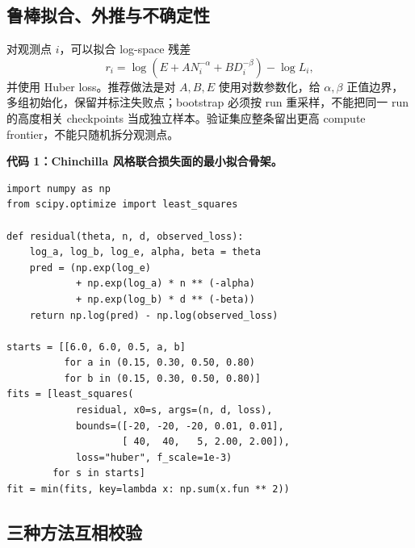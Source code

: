 \documentclass[UTF8,10pt,a4paper,fontset=none]{ctexart}
\begin{document}
\subsection{鲁棒拟合、外推与不确定性}

对观测点 $i$，可以拟合 log-space 残差
\begin{equation}
 r_i=\log\!\left(E+A N_i^{-\alpha}+B D_i^{-\beta}\right)-\log L_i,
 \label{zh:eq:residual}
\end{equation}
并使用 Huber loss。推荐做法是对 $A,B,E$ 使用对数参数化，给 $\alpha,\beta$ 正值边界，多组初始化，保留并标注失败点；bootstrap 必须按 run 重采样，不能把同一 run 的高度相关 checkpoints 当成独立样本。验证集应整条留出更高 compute frontier，不能只随机拆分观测点。

\noindent\textbf{代码 1：Chinchilla 风格联合损失面的最小拟合骨架。}\par\vspace{5pt}
\begin{small}
\setlength{\fboxsep}{7pt}
\setlength{\fboxrule}{0.4pt}
\begin{lrbox}{\fitcodebox}
\begin{minipage}{\dimexpr\textwidth-2\fboxsep-2\fboxrule\relax}
\vspace{1pt}
\begin{verbatim}
import numpy as np
from scipy.optimize import least_squares

def residual(theta, n, d, observed_loss):
    log_a, log_b, log_e, alpha, beta = theta
    pred = (np.exp(log_e)
            + np.exp(log_a) * n ** (-alpha)
            + np.exp(log_b) * d ** (-beta))
    return np.log(pred) - np.log(observed_loss)

starts = [[6.0, 6.0, 0.5, a, b]
          for a in (0.15, 0.30, 0.50, 0.80)
          for b in (0.15, 0.30, 0.50, 0.80)]
fits = [least_squares(
            residual, x0=s, args=(n, d, loss),
            bounds=([-20, -20, -20, 0.01, 0.01],
                    [ 40,  40,   5, 2.00, 2.00]),
            loss="huber", f_scale=1e-3)
        for s in starts]
fit = min(fits, key=lambda x: np.sum(x.fun ** 2))
\end{verbatim}
\vspace{-5pt}
\end{minipage}
\end{lrbox}
\noindent{}\par
\end{small}

\subsection{三种方法互相校验}
\end{document}
